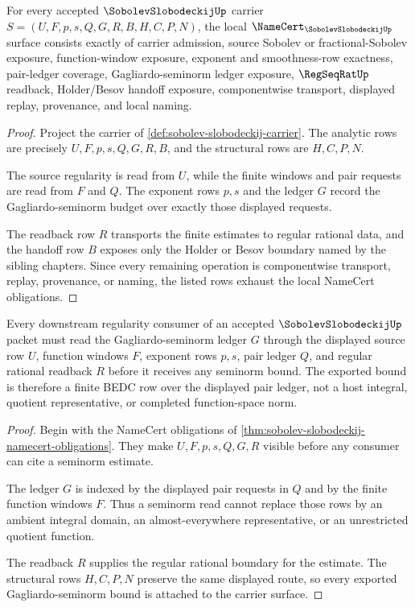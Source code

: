 \begin{theorem}
\label{thm:sobolev-slobodeckij-namecert-obligations}
For every accepted $\SobolevSlobodeckijUp$ carrier $S=(U,F,p,s,Q,G,R,B,H,C,P,N)$, the local $\NameCert_{\SobolevSlobodeckijUp}$ surface consists exactly of carrier admission, source Sobolev or fractional-Sobolev exposure, function-window exposure, exponent and smoothness-row exactness, pair-ledger coverage, Gagliardo-seminorm ledger exposure, $\RegSeqRatUp$ readback, Holder/Besov handoff exposure, componentwise transport, displayed replay, provenance, and local naming.
\end{theorem}
\begin{proof}
Project the carrier of \autoref{def:sobolev-slobodeckij-carrier}. The analytic rows are precisely $U,F,p,s,Q,G,R,B$, and the structural rows are $H,C,P,N$.

The source regularity is read from $U$, while the finite windows and pair requests are read from $F$ and $Q$. The exponent rows $p,s$ and the ledger $G$ record the Gagliardo-seminorm budget over exactly those displayed requests.

The readback row $R$ transports the finite estimates to regular rational data, and the handoff row $B$ exposes only the Holder or Besov boundary named by the sibling chapters. Since every remaining operation is componentwise transport, replay, provenance, or naming, the listed rows exhaust the local NameCert obligations.
\end{proof}

\begin{theorem}
\label{thm:sobolev-slobodeckij-gagliardo-seminorm-boundary}
Every downstream regularity consumer of an accepted $\SobolevSlobodeckijUp$ packet must read the Gagliardo-seminorm ledger $G$ through the displayed source row $U$, function windows $F$, exponent rows $p,s$, pair ledger $Q$, and regular rational readback $R$ before it receives any seminorm bound. The exported bound is therefore a finite BEDC row over the displayed pair ledger, not a host integral, quotient representative, or completed function-space norm.
\end{theorem}
\begin{proof}
Begin with the NameCert obligations of \autoref{thm:sobolev-slobodeckij-namecert-obligations}. They make $U,F,p,s,Q,G,R$ visible before any consumer can cite a seminorm estimate.

The ledger $G$ is indexed by the displayed pair requests in $Q$ and by the finite function windows $F$. Thus a seminorm read cannot replace those rows by an ambient integral domain, an almost-everywhere representative, or an unrestricted quotient function.

The readback $R$ supplies the regular rational boundary for the estimate. The structural rows $H,C,P,N$ preserve the same displayed route, so every exported Gagliardo-seminorm bound is attached to the carrier surface.
\end{proof}


